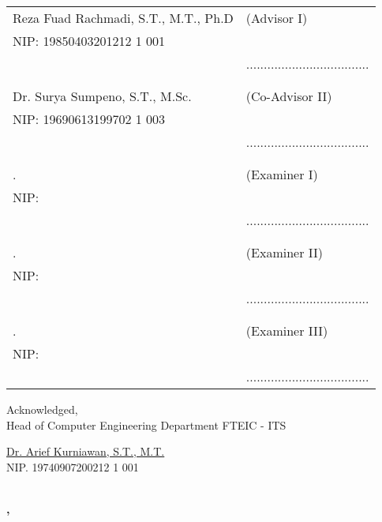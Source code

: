 \noindent
\begin{tabularx}{\textwidth}{X l}
  Reza Fuad Rachmadi, S.T., M.T., Ph.D               & (Advisor I)                         \\
  NIP: 19850403201212 1 001        &                                     \\
                           & ................................... \\
                           &                                     \\
                           &                                     \\
  Dr. Surya Sumpeno, S.T., M.Sc.             & (Co-Advisor II)                     \\
  NIP: 19690613199702 1 003      &                                     \\
                           & ................................... \\
                           &                                     \\
                           &                                     \\
  \examinerone{}.          & (Examiner I)                        \\
  NIP: \examineronenip{}   &                                     \\
                           & ................................... \\
                           &                                     \\
                           &                                     \\
  \examinertwo{}.          & (Examiner II)                       \\
  NIP: \examinertwonip{}   &                                     \\
                           & ................................... \\
                           &                                     \\
                           &                                     \\
  \examinerthree{}.        & (Examiner III)                      \\
  NIP: \examinerthreenip{} &                                     \\
                           & ................................... \\
\end{tabularx}
\endgroup


\begin{center}
  Acknowledged, \\
  Head of Computer Engineering Department FTEIC - ITS \\

  \vspace{8ex}

  \underline{Dr. Arief Kurniawan, S.T., M.T.} \\
  NIP. 19740907200212 1 001
\end{center}

\begin{center}
  \textbf{\MakeUppercase{\place{}}\\\ENGMONTH{}, \the\year{}}
\end{center}
\endgroup
